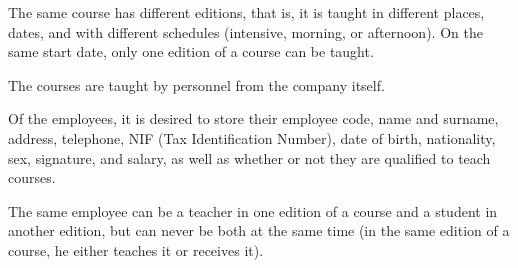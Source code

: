 \documentclass{article}
\begin{document}
The same course has different editions, that is, it is taught in different places, dates, and with different schedules (intensive, morning, or afternoon).  On the same start date, only one edition of a course can be taught.

The courses are taught by personnel from the company itself.

Of the employees, it is desired to store their employee code, name and surname, address, telephone, NIF (Tax Identification Number), date of birth, nationality, sex, signature, and salary, as well as whether or not they are qualified to teach courses.

The same employee can be a teacher in one edition of a course and a student in another edition, but can never be both at the same time (in the same edition of a course, he either teaches it or receives it).
\end{document}
